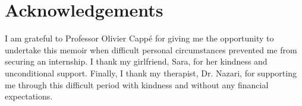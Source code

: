 \documentclass[11pt]{article}
\begin{document}



















\FloatBarrier
\section*{Acknowledgements}
I am grateful to Professor Olivier Cappé for giving me the opportunity to undertake this memoir when difficult personal circumstances prevented me from securing an internship. I thank my girlfriend, Sara, for her kindness and unconditional support. Finally, I thank my therapist, Dr. Nazari, for supporting me through this difficult period with kindness and without any financial expectations.



\clearpage
\appendix
{}












\end{document}
